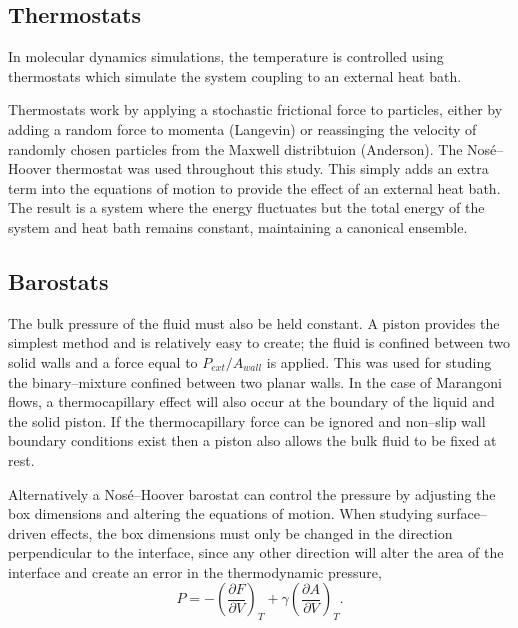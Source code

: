 \subsection{Thermostats}\label{Thermostats}
In molecular dynamics simulations, the temperature is controlled using thermostats which simulate the system coupling to an external heat bath.

Thermostats work by applying a stochastic frictional force to particles, either by adding a random force to momenta (Langevin)\cite{Langevin} or reassinging the velocity of randomly chosen particles from the Maxwell distribtuion (Anderson)\cite{AndersonTherm}.
The Nos\'{e}--Hoover thermostat was used throughout this study.
This simply adds an extra term into the equations of motion to provide the effect of an external heat bath.\cite{NoseHoover1, NoseHoover2, NoseHoover3}
The result is a system where the energy fluctuates but the total energy of the system and heat bath remains constant, maintaining a canonical ensemble.

\subsection{Barostats}\label{Barostats}
The bulk pressure of the fluid must also be held constant.
A piston provides the simplest method and is relatively easy to create; the fluid is confined between two solid walls and a force equal to $P_{ext} / A_{wall}$ is applied.
This was used for studing the binary--mixture confined between two planar walls.
In the case of Marangoni flows, a thermocapillary effect will also occur at the boundary of the liquid and the solid piston.
If the thermocapillary force can be ignored and non--slip wall boundary conditions exist then a piston also allows the bulk fluid to be fixed at rest.

Alternatively a Nos\'{e}--Hoover barostat can control the pressure by adjusting the box dimensions and altering the equations of motion. \cite{NoseHoover1, NoseHoover2, NoseHoover3}
When studying surface--driven effects, the box dimensions must only be changed in the direction perpendicular to the interface, since any other direction will alter the area of the interface and create an error in the thermodynamic pressure,
\begin{equation}
P = - \left( \frac{\partial F}{\partial V} \right)_{T} + \gamma \left( \frac{\partial A}{\partial V} \right)_{T}.
\end{equation}

